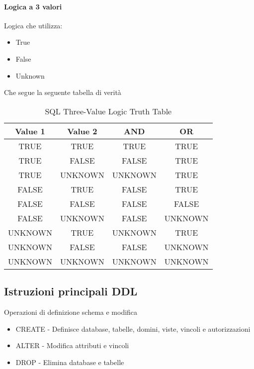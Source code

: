 \paragraph*{Logica a 3 valori} Logica che utilizza:
\begin{itemize}
  \item True
  \item False
  \item Unknown
\end{itemize}
Che segue la seguente tabella di verità
\begin{table}[h]
  \centering
  \caption{SQL Three-Value Logic Truth Table}
  \begin{tabular}{|c|c|c|c|}
    \hline
    \textbf{Value 1} & \textbf{Value 2} & \textbf{AND} & \textbf{OR} \\
    \hline
    TRUE             & TRUE             & TRUE         & TRUE        \\
    \hline
    TRUE             & FALSE            & FALSE        & TRUE        \\
    \hline
    TRUE             & UNKNOWN          & UNKNOWN      & TRUE        \\
    \hline
    FALSE            & TRUE             & FALSE        & TRUE        \\
    \hline
    FALSE            & FALSE            & FALSE        & FALSE       \\
    \hline
    FALSE            & UNKNOWN          & FALSE        & UNKNOWN     \\
    \hline
    UNKNOWN          & TRUE             & UNKNOWN      & TRUE        \\
    \hline
    UNKNOWN          & FALSE            & FALSE        & UNKNOWN     \\
    \hline
    UNKNOWN          & UNKNOWN          & UNKNOWN      & UNKNOWN     \\
    \hline
  \end{tabular}
\end{table}

\subsection{Istruzioni principali DDL}
Operazioni di definizione schema e modifica
\begin{itemize}
  \item CREATE - Definisce database, tabelle, domini, viste, vincoli e autorizzazioni
  \item ALTER - Modifica attributi e vincoli
  \item DROP - Elimina database e tabelle
\end{itemize}
